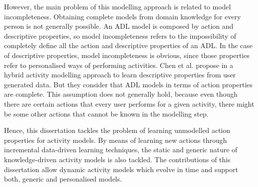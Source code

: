 However, the main problem of this modelling approach is related to model incompleteness. Obtaining complete models from domain knowledge for every person is not generally possible. An ADL model is composed by action and descriptive properties, so model incompleteness refers to the impossibility of completely define all the action and descriptive properties of an ADL. In the case of descriptive properties, model incompleteness is obvious, since those properties refer to personalised ways of performing activities. Chen et al. propose in \cite{Chen2014} a hybrid activity modelling approach to learn descriptive properties from user generated data. But they consider that ADL models in terms of action properties are complete. This assumption does not generally hold, because even though there are certain actions that every user performs for a given activity, there might be some other actions that cannot be known in the modelling step. 

Hence, this dissertation tackles the problem of learning unmodelled action properties for activity models. By means of learning new actions through incremental data-driven learning techniques, the static and generic nature of knowledge-driven activity models is also tackled. The contributions of this dissertation allow dynamic activity models which evolve in time and support both, generic and personalised models.